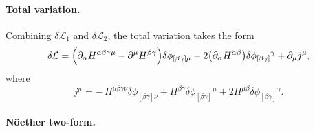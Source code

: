 \documentclass[a4paper,12pt]{article}
\begin{document}
\paragraph{Total variation.} Combining $\delta\mathcal L_1$ and $\delta\mathcal L_2$, the total variation
takes the form
\begin{equation}
\delta\mathcal L
=
\Bigl(
\partial_{\alpha}H^{\alpha\beta\gamma\mu}
-\partial^{\mu}H^{\beta\gamma}
\Bigr)\delta\phi_{[\beta\gamma]\mu}
-2\bigl(\partial_{\alpha}H^{\alpha\beta}\bigr)
\delta\phi_{[\beta\gamma]}{}^{\gamma}
+\partial_{\mu}\\j^{\mu},
\end{equation}
where
\begin{equation}
j^{\mu}
=
-\,H^{\mu\beta\gamma\nu}\delta\phi_{[\beta\gamma]\nu}
+H^{\beta\gamma}\delta\phi_{[\beta\gamma]}{}^{\mu}
+2H^{\mu\beta}\delta\phi_{[\beta\gamma]}{}^{\gamma}.
\end{equation}
\paragraph{N\"oether two-form.}
\end{document}
